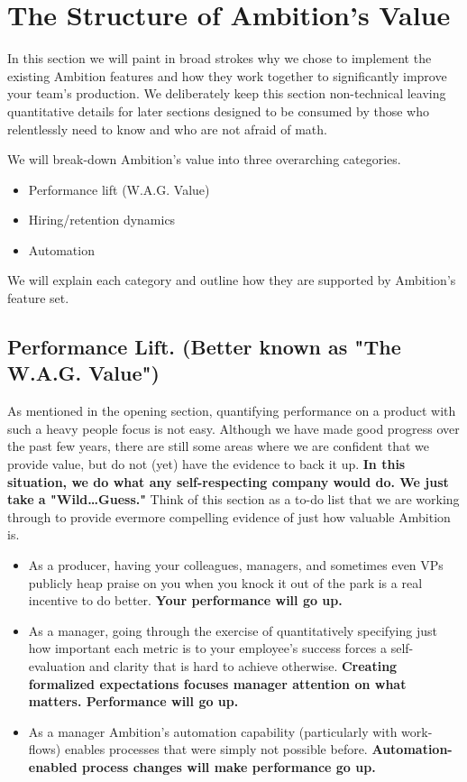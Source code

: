 \documentclass[paper=a4, fontsize=11pt abstract]{scrartcl}
\numberwithin{equation}{section}		%
\numberwithin{figure}{section}			%
\numberwithin{table}{section}				%
\begin{document}
\begin{itemize}
\end{itemize}

\section{The Structure of Ambition's Value}
In this section we will paint in broad strokes why we chose to implement the existing Ambition features and how they work together to significantly improve your team's production.  We deliberately keep this section non-technical leaving quantitative details for later sections designed to be consumed by those who relentlessly need to know and who are not afraid of math.

We will break-down Ambition's value into three overarching categories.
\begin{itemize}
    \item Performance lift (W.A.G. Value)
    \item Hiring/retention dynamics
    \item Automation
\end{itemize}
We will explain each category and outline how they are supported by Ambition's feature set.

\subsection{Performance Lift. (Better known as "The W.A.G. Value")}
As mentioned in the opening section, quantifying performance on a product with such a heavy people focus is not easy.  Although we have made good progress over the past few years, there are still some areas where we are confident that we provide value, but do not (yet) have the evidence to back it up.  \textbf{In this situation, we do what any self-respecting company would do. We just take a "Wild\ldots Guess."} Think of this section as a to-do list that we are working through to provide evermore compelling evidence of just how valuable Ambition is.
\begin{itemize}
    \item As a producer, having your colleagues, managers, and sometimes even VPs publicly heap praise on you when you knock it out of the park is a real incentive to do better.  \textbf{Your performance will go up.} 
    
    \item As a manager, going through the exercise of quantitatively specifying just how important each metric is to your employee's success forces a self-evaluation and clarity that is hard to achieve otherwise. \textbf{Creating formalized expectations focuses manager attention on what matters.  Performance will go up.}
    
    \item As a manager Ambition's automation capability (particularly with work-flows) enables processes that were simply not possible before. \textbf{Automation-enabled process changes will make performance go up.}
\end{itemize}
\end{document}
